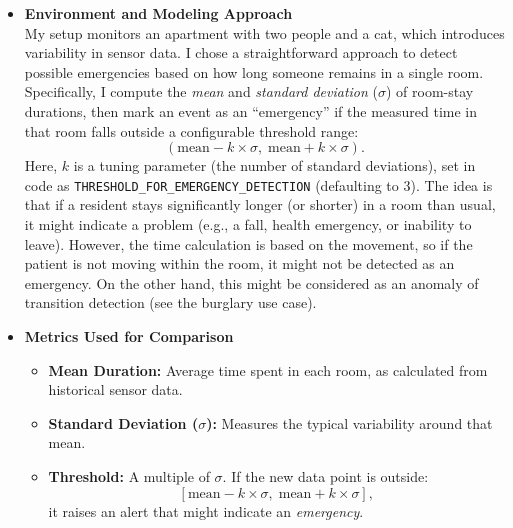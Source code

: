 \documentclass[A4,10pt]{article}
\begin{document}
\begin{itemize}
    \item \textbf{Environment and Modeling Approach} \\
    My setup monitors an apartment with two people and a cat, which introduces variability in sensor data. I chose a straightforward approach to detect possible emergencies based on how long someone remains in a single room. Specifically, I compute the \emph{mean} and \emph{standard deviation} (\( \sigma \)) of room-stay durations, then mark an event as an ``emergency'' if the measured time in that room falls outside a configurable threshold range:
    \[
      (\text{mean} - k \times \sigma, \;\text{mean} + k \times \sigma).
    \]
    Here, \(k\) is a tuning parameter (the number of standard deviations), set in code as \texttt{THRESHOLD\_FOR\_EMERGENCY\_DETECTION} (defaulting to 3). The idea is that if a resident stays significantly longer (or shorter) in a room than usual, it might indicate a problem (e.g., a fall, health emergency, or inability to leave). However, the time calculation is based on the movement, so if the patient is not moving within the room, it might not be detected as an emergency. On the other hand, this might be considered as an anomaly of transition detection (see the burglary use case).

    \item \textbf{Metrics Used for Comparison} \\
    \begin{itemize}
        \item \textbf{Mean Duration:} Average time spent in each room, as calculated from historical sensor data.
        \item \textbf{Standard Deviation (\(\sigma\)):} Measures the typical variability around that mean.
        \item \textbf{Threshold:} A multiple of \(\sigma\). If the new data point is outside:
        \[
          [\text{mean} - k \times \sigma,\; \text{mean} + k \times \sigma],
        \]
        it raises an alert that might indicate an \emph{emergency}.
    \end{itemize}


\end{itemize}
\end{document}

